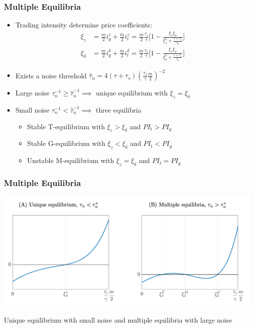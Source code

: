 \documentclass[handout]{beamer}
\begin{document}
\begin{frame}
\frametitle{Multiple Equilibria}
\begin{itemize}[<+->]
\item Trading intensity determine price coefficients:
\begin{align*}
\xi_z &= \frac{m}{2}i_g^z + \frac{m}{2}i_t^z = \frac{m}{2} \frac{\tau_s}{\gamma} \Bigg[1 - \frac{\xi_z \xi_\delta}{\xi_z^2 + \frac{\tau +\tau_s}{\tau_n}}\Bigg]\\
\xi_\delta &= \frac{m}{2}i_g^\delta + \frac{m}{2}i_t^\delta = \frac{m}{2} \frac{\tau_s}{\gamma} \Bigg[1 - \frac{\xi_z \xi_\delta}{\xi_\delta^2 + \frac{\tau +\tau_s}{\tau_n}}\Bigg]
\end{align*}
\bigskip
\item Exists a noise threshold $\hat{\tau}_n = 4(\tau + \tau_s) (\frac{\tau_2}{\gamma}\frac{m}{2})^{-2}$
\bigskip
\item  Large noise $\tau_n^{-1} \ge \hat\tau_n^{-1} \implies$ unique equilibrium with $\xi_z = \xi_\delta$
\bigskip
\item Small noise $\tau_n^{-1} < \hat\tau_n^{-1} \implies$ three equilibria
\begin{itemize}[<+->]
\item Stable T-equilibrium with $\xi_z > \xi_\delta$ and $PI_t > PI_g$
\item Stable G-equilibrium with $\xi_z < \xi_\delta$ and $PI_t < PI_g$
\item Unstable M-equilibrium with $\xi_z = \xi_\delta$ and $PI_t = PI_g$
\end{itemize}
\end{itemize}
\end{frame}


\begin{frame}
\frametitle{Multiple Equilibria}
\begin{center}
\includegraphics[scale=0.35]{multiple_equilibria}
\end{center}
Unique equilibrium with small noise and multiple equilibria with large noise
\end{frame}
\end{document}
